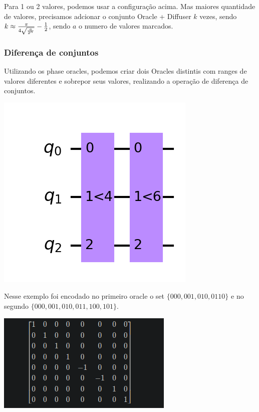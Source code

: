\documentclass{article}
\begin{document}
Para 1 ou 2 valores, podemos usar a configuração acima. Mas maiores quantidade de valores, precisamos adcionar o conjunto Oracle + Diffuser $k$ vezes, sendo $k \approx { {\pi \over {4 \sqrt{a\over{2^n}}}} - {1\over2}  }$, sendo $a$ o numero de valores marcados.

\subsubsection{Diferença de conjuntos}

Utilizando os phase oracles, podemos criar dois Oracles distintis com ranges de valores diferentes e sobrepor seus valores, realizando a operação de diferença de conjuntos.

\begin{center}
	\includegraphics[scale=0.3]{less_than.png}
	\label{fig:less-than-circuit}
\end{center}

Nesse exemplo foi encodado no primeiro oracle o set $\{000, 001, 010, 0110\}$ e no segundo $\{000, 001, 010, 011, 100, 101\}$.

\begin{center}
	\includegraphics[scale=0.5]{less_than_unitary.png}
	\label{fig:less-than-circuit-unitary}
\end{center}
\end{document}
